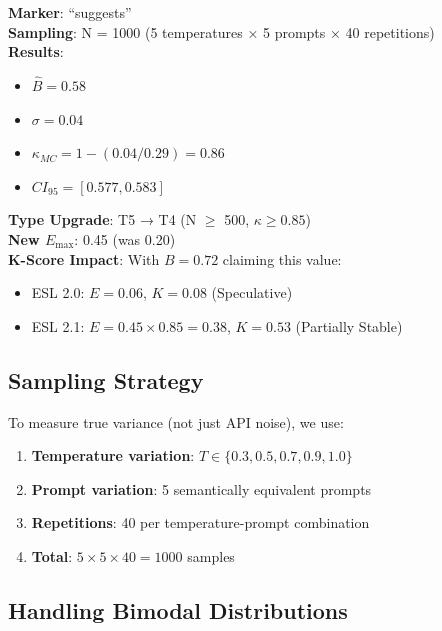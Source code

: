 \documentclass[11pt,a4paper]{article}
\begin{document}
\begin{practicalbox}[title={Example: MC-Validated B-Value}]
\textbf{Marker}: ``suggests'' \\
\textbf{Sampling}: N = 1000 (5 temperatures × 5 prompts × 40 repetitions) \\[0.3em]
\textbf{Results}:
\begin{itemize}
    \item $\hat{B} = 0.58$
    \item $\sigma = 0.04$
    \item $\kappa_{MC} = 1 - (0.04/0.29) = 0.86$
    \item $CI_{95} = [0.577, 0.583]$
\end{itemize}

\textbf{Type Upgrade}: T5 → T4 (N $\geq$ 500, $\kappa \geq 0.85$) \\
\textbf{New $E_{\max}$}: 0.45 (was 0.20) \\[0.3em]
\textbf{K-Score Impact}: With $B = 0.72$ claiming this value:
\begin{itemize}
    \item ESL 2.0: $E = 0.06$, $K = 0.08$ (Speculative)
    \item ESL 2.1: $E = 0.45 \times 0.85 = 0.38$, $K = 0.53$ (Partially Stable)
\end{itemize}
\end{practicalbox}

\subsection{Sampling Strategy}

To measure true variance (not just API noise), we use:

\begin{enumerate}
    \item \textbf{Temperature variation}: $T \in \{0.3, 0.5, 0.7, 0.9, 1.0\}$
    \item \textbf{Prompt variation}: 5 semantically equivalent prompts
    \item \textbf{Repetitions}: 40 per temperature-prompt combination
    \item \textbf{Total}: $5 \times 5 \times 40 = 1000$ samples
\end{enumerate}

\subsection{Handling Bimodal Distributions}
\end{document}
